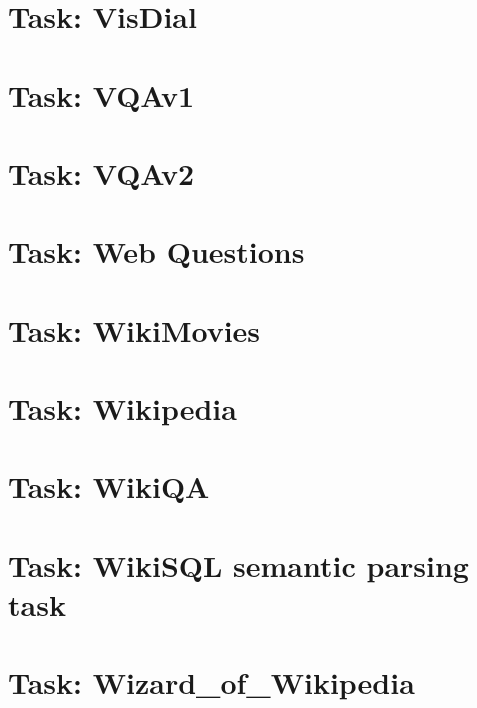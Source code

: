 \documentclass[twoside]{book}
\newcommand{\+}{\discretionary{\mbox{\scriptsize$\hookleftarrow$}}{}{}}
\begin{document}
\chapter{Task\+: Vis\+Dial}
\label{md_parlai_tasks_visdial_README}

\chapter{Task\+: V\+Q\+Av1}
\label{md_parlai_tasks_vqa_v1_README}

\chapter{Task\+: V\+Q\+Av2}
\label{md_parlai_tasks_vqa_v2_README}

\chapter{Task\+: Web Questions}
\label{md_parlai_tasks_webquestions_README}

\chapter{Task\+: Wiki\+Movies}
\label{md_parlai_tasks_wikimovies_README}

\chapter{Task\+: Wikipedia}
\label{md_parlai_tasks_wikipedia_README}

\chapter{Task\+: Wiki\+QA}
\label{md_parlai_tasks_wikiqa_README}

\chapter{Task\+: Wiki\+S\+QL semantic parsing task}
\label{md_parlai_tasks_wikisql_README}

\chapter{Task\+: Wizard\+\_\+of\+\_\+\+Wikipedia}
\label{md_parlai_tasks_wizard_of_wikipedia_README}

\end{document}

